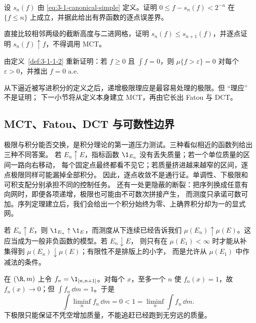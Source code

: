 \begin{exercise}
设 $s_n(f)$ 由 \eqref{eq:3-1-canonical-simple} 定义。证明
$0\leq f-s_n(f)<2^{-n}$ 在 $\{f\leq n\}$ 上成立，并据此给出有界函数的逐点误差界。
\end{exercise}

\begin{exercise}
直接比较相邻两级的截断高度与二进网格，证明
$s_n(f)\le s_{n+1}(f)$，并逐点证明 $s_n(f)\uparrow f$，不得调用 MCT。
\end{exercise}

\begin{exercise}
由定义~\ref{def:3-1-1-2} 重新证明：若 $f\geq0$ 且 $\int f=0$，则
$\mu\{f>\varepsilon\}=0$ 对每个 $\varepsilon>0$，并推出 $f=0$ a.e.
\end{exercise}

从下逼近被写进积分的定义之后，递增极限理应是最容易处理的极限。但 ``理应'' 不是证明；
下一小节将从定义本身建立 MCT，再由它长出 Fatou 与 DCT。

\subsection{MCT、Fatou、DCT 与可数性边界}\label{subsec:3-1-2}

极限与积分能否交换，是积分理论的第一道压力测试。三种看似相近的函数列给出三种不同答案。
若 $E_n\uparrow E$，指标函数 $\1_{E_n}$ 没有丢失质量；若一个单位质量的区间一路向右移动，
每个固定点最终都看不见它；若质量挤进越来越窄的区间，逐点极限同样可能漏掉全部积分。
因此，逐点收敛不是通行证。单调性、下极限和可积支配分别承担不同的控制任务。
还有一处更隐蔽的断裂：把序列换成任意有向网时，即便各项递增，极限也可能由不可数次拼接产生，
而测度只承诺可数可加。序列定理建立后，我们会给出一个积分始终为零、上确界积分却为一的显式网。

\begin{example}[单调示性函数]\label{ex:3-1-2-1}
若 $E_n\uparrow E$，则 $\1_{E_n}\uparrow\1_E$，而测度从下连续已经告诉我们
$\mu(E_n)\uparrow\mu(E)$。这应当成为一般非负函数的模型。若 $E_n\downarrow E$，
则只有在 $\mu(E_1)<\infty$ 时才能从补集得到 $\mu(E_n)\downarrow\mu(E)$；有限性不是排版上的小字，
而是允许从 $\mu(E_1)$ 中作减法的条件。
\end{example}

\begin{example}[质量逃向无穷远]\label{ex:3-1-2-2}
在 $(\R,m)$ 上令 $f_n=\1_{[n,n+1]}$。对每个 $x$，至多一个 $n$ 使 $f_n(x)=1$，故
$f_n(x)\to0$；但 $\int f_n\,\dd m=1$。于是
\[
 \int\liminf_nf_n\,\dd m=0
 <1=\liminf_n\int f_n\,\dd m.
 \tag{3.1.9}\label{eq:3-1-fatou-strict}
\]
下极限只能保证不凭空增加质量，不能追赶已经跑到无穷远的质量。
\end{example}

